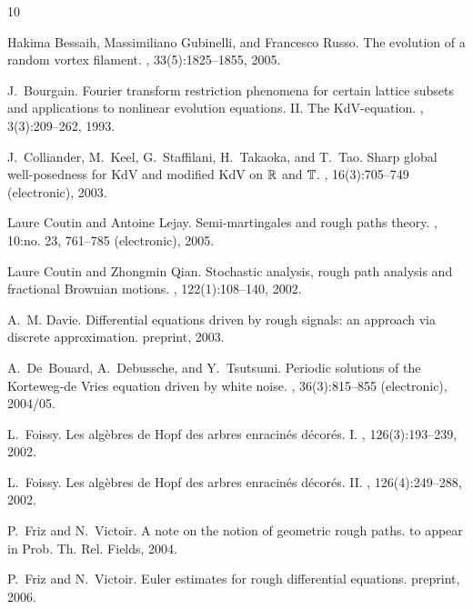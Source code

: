 \documentclass[a4paper,11pt,reqno]{article}
\begin{document}
\begin{thebibliography}{10}

Hakima Bessaih, Massimiliano Gubinelli, and Francesco Russo.
\newblock The evolution of a random vortex filament.
, 33(5):1825--1855, 2005.

J.~Bourgain.
\newblock Fourier transform restriction phenomena for certain lattice subsets
  and applications to nonlinear evolution equations. {II}. {T}he
  {K}d{V}-equation.
, 3(3):209--262, 1993.

J.~Colliander, M.~Keel, G.~Staffilani, H.~Takaoka, and T.~Tao.
\newblock Sharp global well-posedness for {K}d{V} and modified {K}d{V} on
  {$\Bbb R$} and {$\Bbb T$}.
, 16(3):705--749 (electronic), 2003.

Laure Coutin and Antoine Lejay.
\newblock Semi-martingales and rough paths theory.
, 10:no. 23, 761--785 (electronic), 2005.

Laure Coutin and Zhongmin Qian.
\newblock Stochastic analysis, rough path analysis and fractional {B}rownian
  motions.
, 122(1):108--140, 2002.

A.~M. Davie.
\newblock Differential equations driven by rough signals: an approach via
  discrete approximation.
\newblock preprint, 2003.

A.~De~Bouard, A.~Debussche, and Y.~Tsutsumi.
\newblock Periodic solutions of the {K}orteweg-de {V}ries equation driven by
  white noise.
, 36(3):815--855 (electronic), 2004/05.

L.~Foissy.
\newblock Les alg\`ebres de {H}opf des arbres enracin\'es d\'ecor\'es. {I}.
, 126(3):193--239, 2002.

L.~Foissy.
\newblock Les alg\`ebres de {H}opf des arbres enracin\'es d\'ecor\'es. {II}.
, 126(4):249--288, 2002.

P.~Friz and N.~Victoir.
\newblock A note on the notion of geometric rough paths.
\newblock to appear in Prob. Th. Rel. Fields, 2004.

P.~Friz and N.~Victoir.
\newblock Euler estimates for rough differential equations.
\newblock preprint, 2006.


\end{thebibliography}
\end{document}
